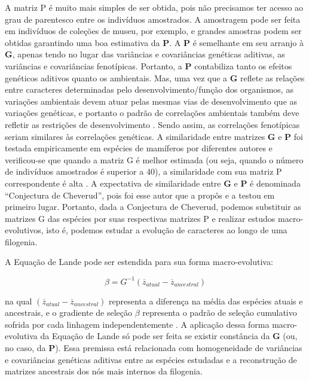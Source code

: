 \documentclass[portuges,]{tufte-handout}
\begin{document}
A matriz P é muito mais simples de ser obtida, pois não precisamos ter
acesso ao grau de parentesco entre os indivíduos amostrados. A
amostragem pode ser feita em indivíduos de coleções de museu, por
exemplo, e grandes amostras podem ser obtidas garantindo uma boa
estimativa da \(\mathbf{P}\). A \(\mathbf{P}\) é semelhante em seu
arranjo à \(\mathbf{G}\), apenas tendo no lugar das variâncias e
covariâncias genéticas aditivas, as variâncias e covariâncias
fenotípicas. Portanto, a \(\mathbf{P}\) contabiliza tanto os efeitos
genéticos aditivos quanto os ambientais. Mas, uma vez que a
\(\mathbf{G}\) reflete as relações entre caracteres determinadas pelo
desenvolvimento/função dos organismos, as variações ambientais devem
atuar pelas mesmas vias de desenvolvimento que as variações genéticas, e
portanto o padrão de correlações ambientais também deve refletir as
restrições de desenvolvimento \cite{Cheverud1984}. Sendo assim, as
correlações fenotípicas seriam similares às correlações genéticas. A
similaridade entre matrizes \(\mathbf{G}\) e \(\mathbf{P}\) foi testada
empiricamente em espécies de mamíferos por diferentes autores e
verificou-se que quando a matriz G é melhor estimada (ou seja, quando o
número de indivíduos amostrados é superior a 40), a similaridade com sua
matriz P correspondente é alta \cite{Cheverud1988}. A expectativa de
similaridade entre \(\mathbf{G}\) e \(\mathbf{P}\) é denominada
``Conjectura de Cheverud'', pois foi esse autor que a propôs e a testou
em primeiro lugar. Portanto, dada a Conjectura de Cheverud, podemos
substituir as matrizes G das espécies por suas respectivas matrizes P e
realizar estudos macro-evolutivos, isto é, podemos estudar a evolução de
caracteres ao longo de uma filogenia.

A Equação de Lande pode ser estendida para sua forma macro-evolutiva:

\[
\beta = G^{-1} (\overline z_{atual} - \overline z_{ancestral})
\]

na qual \((\overline z_{atual} - \overline z_{ancestral})\) representa a
diferença na média das espécies atuais e ancestrais, e o gradiente de
seleção \(\beta\) representa o padrão de seleção cumulativo sofrida por
cada linhagem independentemente \cite{Marroig2005}. A aplicação
dessa forma macro-evolutiva da Equação de Lande só pode ser feita se
existir constância da \(\mathbf{G}\) (ou, no caso, da \(\mathbf{P}\)).
Essa premissa está relacionada com homogeneidade de variâncias e
covariâncias genéticas aditivas entre as espécies estudadas e a
reconstrução de matrizes ancestrais dos nós mais internos da filogenia.
\end{document}
